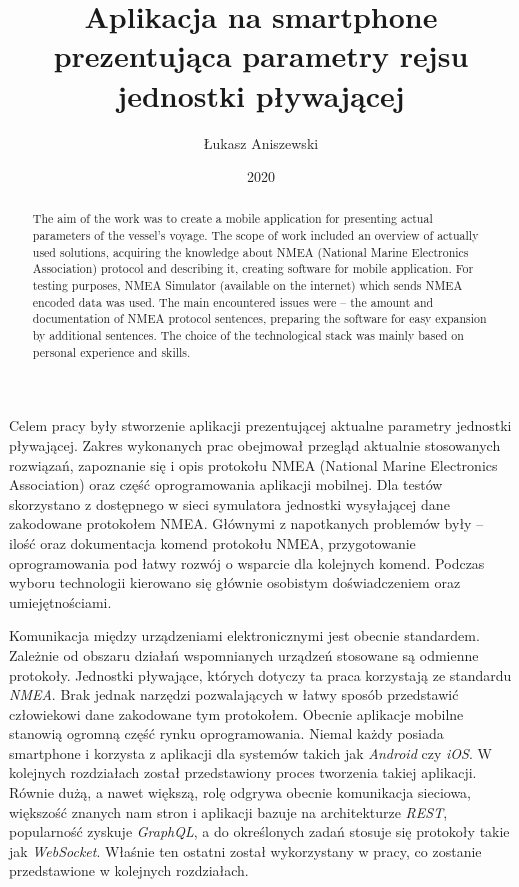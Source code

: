 \documentclass[skorowidz,skroty]{dyplomWEZUT}
\author{Łukasz Aniszewski}
\title{Aplikacja na smartphone prezentująca parametry rejsu jednostki pływającej}
\date{2020}
\begin{document}
\begin{streszczenie}
Celem pracy były stworzenie aplikacji prezentującej aktualne parametry jednostki pływającej. Zakres wykonanych prac obejmował przegląd aktualnie stosowanych rozwiązań, zapoznanie się i opis protokołu NMEA (National Marine Electronics Association) oraz część oprogramowania aplikacji mobilnej. Dla testów skorzystano z dostępnego w sieci symulatora jednostki wysyłającej dane zakodowane protokołem NMEA. Głównymi z napotkanych problemów były – ilość oraz dokumentacja komend protokołu NMEA, przygotowanie oprogramowania pod łatwy rozwój o wsparcie dla kolejnych komend. Podczas wyboru technologii kierowano się głównie osobistym doświadczeniem oraz umiejętnościami. 
\end{streszczenie}

\begin{abstract}
The aim of the work was to create a mobile application for presenting actual parameters of the vessel's voyage. The scope of work included an overview of actually used solutions, acquiring the knowledge about NMEA (National Marine Electronics Association) protocol and describing it, creating software for mobile application. For testing purposes, NMEA Simulator (available on the internet) which sends NMEA encoded data was used. The main encountered issues were – the amount and documentation of NMEA protocol sentences, preparing the software for easy expansion by additional sentences. The choice of the technological stack was mainly based on personal experience and skills.
\end{abstract}

\maketitle

\begin{wprowadzenie}

Komunikacja między urządzeniami elektronicznymi jest obecnie standardem. Zależnie od obszaru działań wspomnianych urządzeń stosowane są odmienne protokoły. Jednostki pływające, których dotyczy ta praca korzystają ze standardu \textit{NMEA}. Brak jednak narzędzi pozwalających w łatwy sposób przedstawić człowiekowi dane zakodowane tym protokołem. Obecnie aplikacje mobilne stanowią ogromną część rynku oprogramowania. Niemal każdy posiada smartphone i korzysta z aplikacji dla systemów takich jak \textit{Android} czy \textit{iOS}. W kolejnych rozdziałach został przedstawiony proces tworzenia takiej aplikacji. Równie dużą, a nawet większą, rolę odgrywa obecnie komunikacja sieciowa, większość znanych nam stron i aplikacji bazuje na architekturze \textit{REST}, popularność zyskuje \textit{GraphQL}, a do określonych zadań stosuje się protokoły takie jak \textit{WebSocket}. Właśnie ten ostatni został wykorzystany w pracy, co zostanie przedstawione w kolejnych rozdziałach. 

\end{wprowadzenie}
\end{document}
